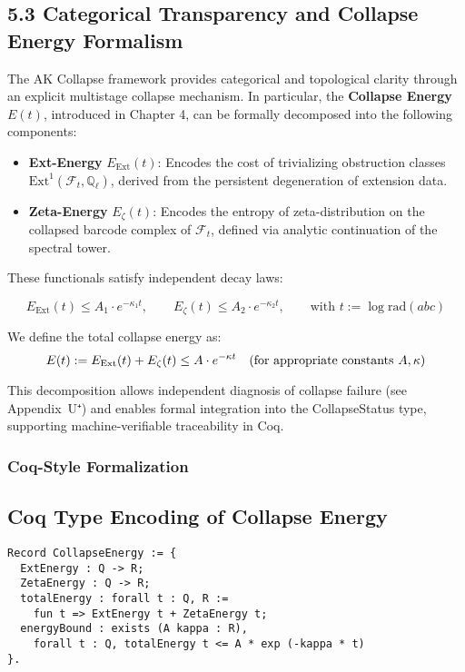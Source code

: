 \documentclass[11pt]{article}
\begin{document}
\subsection{5.3 Categorical Transparency and Collapse Energy Formalism}

The AK Collapse framework provides categorical and topological clarity through an explicit multistage collapse mechanism. In particular, the \textbf{Collapse Energy} \( E(t) \), introduced in Chapter 4, can be formally decomposed into the following components:

\begin{itemize}
    \item \textbf{Ext-Energy} \( E_{\mathrm{Ext}}(t) \): Encodes the cost of trivializing obstruction classes \( \mathrm{Ext}^1(\mathcal{F}_t, \mathbb{Q}_\ell) \), derived from the persistent degeneration of extension data.
    \item \textbf{Zeta-Energy} \( E_{\zeta}(t) \): Encodes the entropy of zeta-distribution on the collapsed barcode complex of \( \mathcal{F}_t \), defined via analytic continuation of the spectral tower.
\end{itemize}

These functionals satisfy independent decay laws:

\[
E_{\mathrm{Ext}}(t) \leq A_1 \cdot e^{-\kappa_1 t},
\qquad
E_{\zeta}(t) \leq A_2 \cdot e^{-\kappa_2 t},
\qquad
\text{with } t := \log \mathrm{rad}(abc)
\]

We define the total collapse energy as:
\[
E(t) := E_{\mathrm{Ext}}(t) + E_{\zeta}(t) \leq A \cdot e^{-\kappa t}
\quad \text{(for appropriate constants \( A, \kappa \))}
\]

This decomposition allows independent diagnosis of collapse failure (see Appendix~U⁺) and enables formal integration into the CollapseStatus type, supporting machine-verifiable traceability in Coq.

\subsubsection*{Coq-Style Formalization}

\subsection{Coq Type Encoding of Collapse Energy}
\begin{lstlisting}
Record CollapseEnergy := {
  ExtEnergy : Q -> R;
  ZetaEnergy : Q -> R;
  totalEnergy : forall t : Q, R :=
    fun t => ExtEnergy t + ZetaEnergy t;
  energyBound : exists (A kappa : R),
    forall t : Q, totalEnergy t <= A * exp (-kappa * t)
}.
\end{lstlisting}
\end{document}
